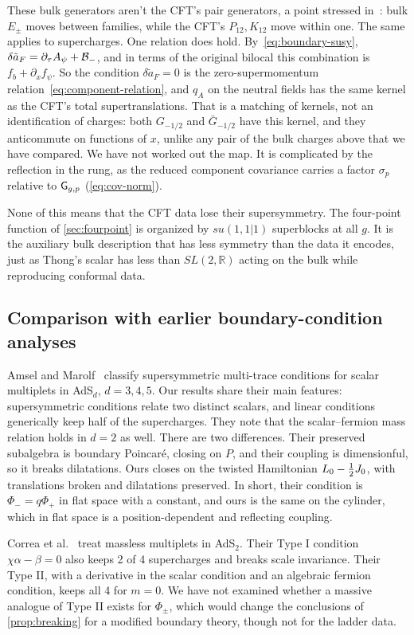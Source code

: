 These bulk generators aren't the CFT's pair generators, a point stressed in~\cite{Thong:2026}: bulk $E_\pm$ moves between families, while the CFT's $P_{12},K_{12}$ move within one. The same applies to supercharges. One relation does hold. By~\eqref{eq:boundary-susy}, $\delta\tilde a_F=\partial_\tau A_\psi+\mathcal{B}_-$, and in terms of the original bilocal this combination is $f_b+\partial_xf_\psi$. So the condition $\delta\tilde a_F=0$ is the zero-supermomentum relation~\eqref{eq:component-relation}, and $q_A$ on the neutral fields has the same kernel as the CFT's total supertranslations. That is a matching of kernels, not an identification of charges: both $G_{-1/2}$ and $\bar G_{-1/2}$ have this kernel, and they anticommute on functions of $x$, unlike any pair of the bulk charges above that we have compared. We have not worked out the map. It is complicated by the reflection in the rung, as the reduced component covariance carries a factor $\sigma_p$ relative to $\mathsf{G}_{g,p}$ (\cref{eq:cov-norm}).

None of this means that the CFT data lose their supersymmetry. The four-point function of \cref{sec:fourpoint} is organized by $su(1,1|1)$ superblocks at all $g$. It is the auxiliary bulk description that has less symmetry than the data it encodes, just as Thong's scalar has less than $SL(2,\mathbb R)$ acting on the bulk while reproducing conformal data.

\subsection{Comparison with earlier boundary-condition analyses}
\label{subsec:compare}

Amsel and Marolf~\cite{Amsel:2008iz} classify supersymmetric multi-trace conditions for scalar multiplets in AdS$_d$, $d=3,4,5$. Our results share their main features: supersymmetric conditions relate two distinct scalars, and linear conditions generically keep half of the supercharges. They note that the scalar--fermion mass relation holds in $d=2$ as well. There are two differences. Their preserved subalgebra is boundary Poincaré, closing on $P$, and their coupling is dimensionful, so it breaks dilatations. Ours closes on the twisted Hamiltonian $L_0-\tfrac12 J_0$, with translations broken and dilatations preserved. In short, their condition is $\Phi_-=q\Phi_+$ in flat space with a constant, and ours is the same on the cylinder, which in flat space is a position-dependent and reflecting coupling.

Correa et al.~\cite{Correa:2019rdk} treat massless multiplets in AdS$_2$. Their Type I condition $\chi\alpha-\beta=0$ also keeps 2 of 4 supercharges and breaks scale invariance. Their Type II, with a derivative in the scalar condition and an algebraic fermion condition, keeps all 4 for $m=0$. We have not examined whether a massive analogue of Type II exists for $\Phi_\pm$, which would change the conclusions of \cref{prop:breaking} for a modified boundary theory, though not for the ladder data.
